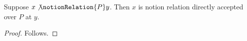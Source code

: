 

\begin{proposition}\label{notion_relation_negated_negative}
    Suppose $x\not\notionRelation{P}y$.
    Then $x$ is notion relation directly accepted over $P$ at $y$.
\end{proposition}
\begin{proof}
    Follows.
\end{proof}
